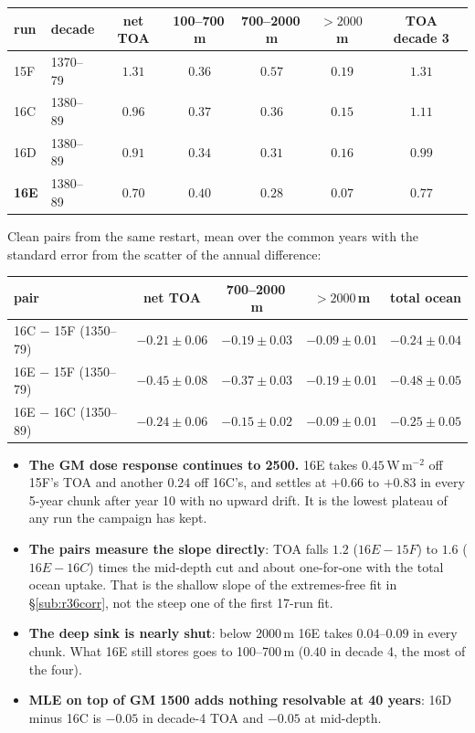 \documentclass[10pt]{article}
\begin{document}
\begin{center}\small
\begin{tabular}{llccccc}
\toprule
run & decade & net TOA & 100--700\,m & 700--2000\,m & $>2000$\,m & TOA decade 3 \\
\midrule
15F & 1370--79 & $1.31$ & $0.36$ & $0.57$ & $0.19$ & $1.31$ \\
16C & 1380--89 & $0.96$ & $0.37$ & $0.36$ & $0.15$ & $1.11$ \\
16D & 1380--89 & $0.91$ & $0.34$ & $0.31$ & $0.16$ & $0.99$ \\
\textbf{16E} & 1380--89 & $\mathbf{0.70}$ & $0.40$ & $\mathbf{0.28}$ & $\mathbf{0.07}$ & $\mathbf{0.77}$ \\
\bottomrule
\end{tabular}
\end{center}

\noindent Clean pairs from the same restart, mean over the common years with the standard
error from the scatter of the annual difference:

\begin{center}\small
\begin{tabular}{lcccc}
\toprule
pair & net TOA & 700--2000\,m & $>2000$\,m & total ocean \\
\midrule
16C $-$ 15F (1350--79) & $-0.21\pm0.06$ & $-0.19\pm0.03$ & $-0.09\pm0.01$ & $-0.24\pm0.04$ \\
16E $-$ 15F (1350--79) & $\mathbf{-0.45\pm0.08}$ & $-0.37\pm0.03$ & $-0.19\pm0.01$ & $-0.48\pm0.05$ \\
16E $-$ 16C (1350--89) & $-0.24\pm0.06$ & $-0.15\pm0.02$ & $-0.09\pm0.01$ & $-0.25\pm0.05$ \\
\bottomrule
\end{tabular}
\end{center}

\begin{itemize}\itemsep2pt
\item \textbf{The GM dose response continues to 2500.} 16E takes $0.45$\,W\,m$^{-2}$ off 15F's
TOA and another $0.24$ off 16C's, and settles at $+0.66$ to $+0.83$ in every 5-year chunk after
year 10 with no upward drift. It is the lowest plateau of any run the campaign has kept.
\item \textbf{The pairs measure the slope directly}: TOA falls $1.2$ ($16E-15F$) to $1.6$
($16E-16C$) times the mid-depth cut and about one-for-one with the total ocean uptake. That is
the shallow slope of the extremes-free fit in \S\ref{sub:r36corr}, not the steep one of the
first 17-run fit.
\item \textbf{The deep sink is nearly shut}: below 2000\,m 16E takes $0.04$--$0.09$ in every
chunk. What 16E still stores goes to 100--700\,m ($0.40$ in decade 4, the most of the four).
\item \textbf{MLE on top of GM 1500 adds nothing resolvable at 40 years}: 16D minus 16C is
$-0.05$ in decade-4 TOA and $-0.05$ at mid-depth.
\end{itemize}
\end{document}
